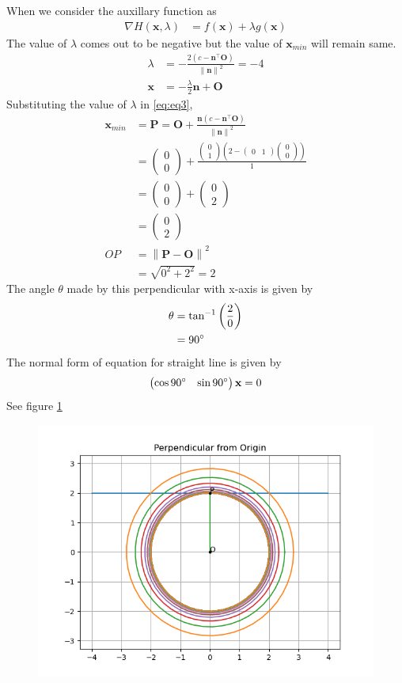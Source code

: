 \documentclass[12pt]{article}
\providecommand{\brak}[1]{\ensuremath{\left(#1\right)}}
\providecommand{\norm}[1]{\left\lVert#1\right\rVert}
\newcommand{\myvec}[1]{\ensuremath{\begin{pmatrix}#1\end{pmatrix}}}
\let\vec\mathbf
\begin{document}
When we consider the auxillary function as
\begin{align}
	\nabla H\brak{\vec{x},\lambda} &= f\brak{\vec{x}}+\lambda g\brak{\vec{x}}
\end{align}
The value of $\lambda$ comes out to be negative but the value of $\vec{x}_{min}$ will remain same.
\begin{align}
	\lambda &= -\frac{2\brak{c-\vec{n}^\top\vec{O}}}{\norm{\vec{n}}^2} = -4\\
	\vec{x} &= -\frac{\lambda}{2}\vec{n}+\vec{O}
\end{align}
Substituting the value of $\lambda$ in \eqref{eq:eq3},
\begin{align}
	\vec{x}_{min} &= \vec{P} = \vec{O}+\frac{\vec{n}\brak{c-\vec{n}^\top\vec{O}}}{\norm{\vec{n}}^2}\\
	&= \myvec{0\\0}+ \frac{\myvec{0\\1}\brak{2-\myvec{0&1}\myvec{0\\0}}}{1}\\
	&= \myvec{0\\0}+\myvec{0\\2}\\
	&= \myvec{0\\2}\\
	OP &= \norm{\vec{P}-\vec{O}}^2\\
	&= \sqrt{0^2+2^2} = 2
\end{align}
The angle $\theta$ made by this perpendicular with x-axis is given by
\begin{align}
	\theta &= \tan^{-1}{\brak{\frac{2}{0}}}\\
	&= 90\degree
\end{align}
The normal form of equation for straight line is given by 
\begin{align}
	\myvec{\cos{90}\degree&\sin{90}\degree}\vec{x} = 0
\end{align}
See figure \ref{fig:Fig1}
\begin{figure}[!h]
	\begin{center} 
	    \includegraphics[width=\columnwidth]{figs/opt3}
	\end{center}
\caption{}
\label{fig:Fig1}
\end{figure}
\end{document}
